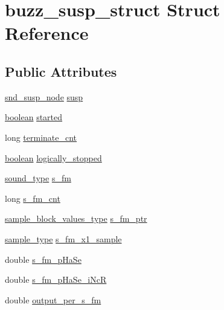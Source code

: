 \hypertarget{structbuzz__susp__struct}{}\section{buzz\+\_\+susp\+\_\+struct Struct Reference}
\label{structbuzz__susp__struct}
\subsection*{Public Attributes}
\begin{DoxyCompactItemize}
\item 
\hyperlink{sound_8h_a6b268203688a934bd798ceb55f85d4c0}{snd\+\_\+susp\+\_\+node} \hyperlink{structbuzz__susp__struct_afdb0128a3eb30e08e1e472b8b4767659}{susp}
\item 
\hyperlink{cext_8h_a7670a4e8a07d9ebb00411948b0bbf86d}{boolean} \hyperlink{structbuzz__susp__struct_afded2dfa5645dfdbedf9cc900d58b519}{started}
\item 
long \hyperlink{structbuzz__susp__struct_a40e3db4633d25ee19ebfd13a04af091f}{terminate\+\_\+cnt}
\item 
\hyperlink{cext_8h_a7670a4e8a07d9ebb00411948b0bbf86d}{boolean} \hyperlink{structbuzz__susp__struct_adcd2b245a14eed379b1dd83e1f31c3c4}{logically\+\_\+stopped}
\item 
\hyperlink{sound_8h_a792cec4ed9d6d636d342d9365ba265ea}{sound\+\_\+type} \hyperlink{structbuzz__susp__struct_a71a1c4e6c06073f273ae9e70922f7e10}{s\+\_\+fm}
\item 
long \hyperlink{structbuzz__susp__struct_a43bebd0378627cb000083354cfdc7222}{s\+\_\+fm\+\_\+cnt}
\item 
\hyperlink{sound_8h_a83d17f7b465d1591f27cd28fc5eb8a03}{sample\+\_\+block\+\_\+values\+\_\+type} \hyperlink{structbuzz__susp__struct_ab0b74e83827de47d91b4beb6146822d3}{s\+\_\+fm\+\_\+ptr}
\item 
\hyperlink{sound_8h_a3a9d1d4a1c153390d2401a6e9f71b32c}{sample\+\_\+type} \hyperlink{structbuzz__susp__struct_a49a6b980304e61dd434ff7f409ceb064}{s\+\_\+fm\+\_\+x1\+\_\+sample}
\item 
double \hyperlink{structbuzz__susp__struct_a8c443a0294c40932c2ee3b797007d1b5}{s\+\_\+fm\+\_\+p\+Ha\+Se}
\item 
double \hyperlink{structbuzz__susp__struct_aa806d3f3517b90d24ff968fd43c4291f}{s\+\_\+fm\+\_\+p\+Ha\+Se\+\_\+i\+NcR}
\item 
double \hyperlink{structbuzz__susp__struct_a420a77129f3d2535ca96185a25cdbc83}{output\+\_\+per\+\_\+s\+\_\+fm}

\end{DoxyCompactItemize}
